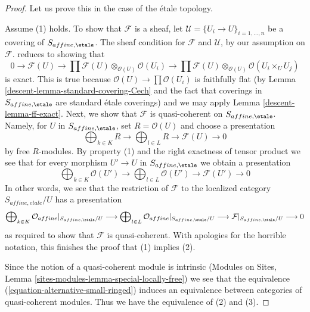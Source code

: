 \begin{proof}

Let us prove this in the case of the \'etale topology.

\medskip\noindent
Assume (1) holds. To show that $\mathcal{F}$ is a sheaf, let
$\mathcal{U} = \{U_i \to U\}_{i = 1, \ldots, n}$ be a covering
of $S_{affine, \etale}$. The sheaf condition for $\mathcal{F}$
and $\mathcal{U}$, by our assumption on $\mathcal{F}$.
reduces to showing that
$$
0 \to \mathcal{F}(U) \to
\prod \mathcal{F}(U) \otimes_{\mathcal{O}(U)} \mathcal{O}(U_i) \to
\prod \mathcal{F}(U) \otimes_{\mathcal{O}(U)} \mathcal{O}(U_i \times_U U_j)
$$
is exact. This is true because $\mathcal{O}(U) \to \prod \mathcal{O}(U_i)$
is faithfully flat (by Lemma \ref{descent-lemma-standard-covering-Cech} and
the fact that coverings in $S_{affine, \etale}$ are standard \'etale
coverings) and we may apply Lemma \ref{descent-lemma-ff-exact}.
Next, we show that $\mathcal{F}$ is quasi-coherent on $S_{affine, \etale}$.
Namely, for $U$ in $S_{affine, \etale}$, set $R = \mathcal{O}(U)$
and choose a presentation
$$
\bigoplus\nolimits_{k \in K} R
\longrightarrow
\bigoplus\nolimits_{l \in L} R
\longrightarrow
\mathcal{F}(U)
\longrightarrow 0
$$
by free $R$-modules. By property (1) and the right exactness of tensor product
we see that for every morphism $U' \to U$ in $S_{affine, \etale}$
we obtain a presentation
$$
\bigoplus\nolimits_{k \in K} \mathcal{O}(U')
\longrightarrow
\bigoplus\nolimits_{l \in L} \mathcal{O}(U')
\longrightarrow
\mathcal{F}(U')
\longrightarrow 0
$$
In other words, we see that the restriction of $\mathcal{F}$
to the localized category $S_{affine, etale}/U$ has a presentation
$$
\bigoplus\nolimits_{k \in K} \mathcal{O}_{affine}|_{S_{affine, \etale}/U}
\longrightarrow
\bigoplus\nolimits_{l \in L} \mathcal{O}_{affine}|_{S_{affine, \etale}/U}
\longrightarrow
\mathcal{F}|_{S_{affine, \etale}/U}
\longrightarrow 0
$$
as required to show that $\mathcal{F}$ is quasi-coherent.
With apologies for the horrible notation, this finishes the proof
that (1) implies (2).

\medskip\noindent
Since the notion of a quasi-coherent module is intrinsic
(Modules on Sites, Lemma \ref{sites-modules-lemma-special-locally-free})
we see that the equivalence (\ref{equation-alternative-small-ringed})
induces an equivalence between categories of quasi-coherent modules.
Thus we have the equivalence of (2) and (3).


\end{proof}

